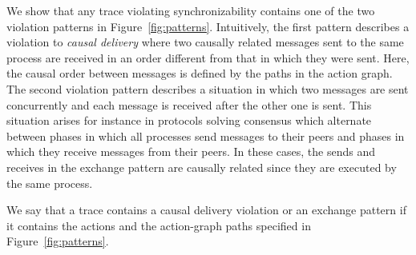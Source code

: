 We show that any trace violating synchronizability contains one of the two violation patterns in Figure~\ref{fig:patterns}.
Intuitively, the first pattern describes a violation to \emph{causal delivery} where two causally related messages sent to the same process
are received in an order different from that in which they were sent. Here, the causal order between messages is defined
by the paths in the action graph. The second violation pattern describes a situation in which two messages are sent concurrently 
and each message is received after the other one is sent. This situation arises for instance in protocols solving consensus which alternate
between phases in which all processes send messages to their peers and phases in which they receive messages from their peers. 
In these cases, the sends and receives in the exchange pattern are causally related since they are executed by the same process.

We say that a trace contains a causal delivery violation or an exchange pattern if it contains the actions and the action-graph paths
specified in Figure~\ref{fig:patterns}.

